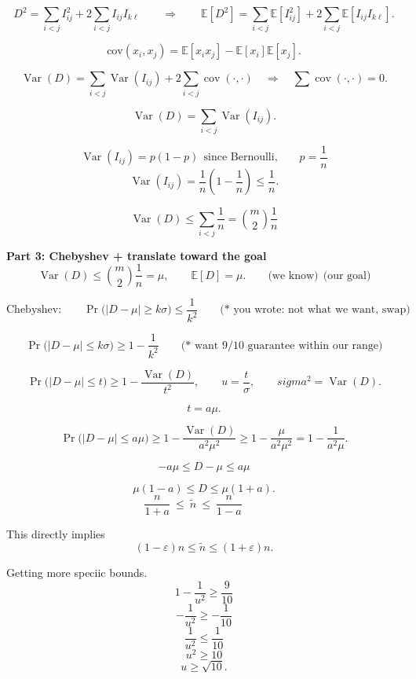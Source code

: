 \documentclass[11pt]{article}
\begin{document}
\begin{enumerate}[label=\arabic*.]
	\[
	D^2=\sum_{i<j} I_{ij}^2 + 2\sum_{i<j} I_{ij}I_{k\ell}
	\qquad\Rightarrow\qquad
	\mathbb{E}[D^2]=\sum_{i<j}\mathbb{E}[I_{ij}^2]+2\sum_{i<j}\mathbb{E}[I_{ij}I_{k\ell}].
	\]

	\[
	\text{cov}(x_i,x_j)=\mathbb{E}[x_ix_j]-\mathbb{E}[x_i]\mathbb{E}[x_j].
	\]

	\[
	\operatorname{Var}(D)
	=\sum_{i<j}\operatorname{Var}(I_{ij})+2\sum_{i<j}\operatorname{cov}(\cdot,\cdot)
	\quad\Rightarrow\quad
	\sum \operatorname{cov}(\cdot,\cdot)=0.
	\]

	\[
	\operatorname{Var}(D)=\sum_{i<j}\operatorname{Var}(I_{ij}).
	\]

	\[
	\operatorname{Var}(I_{ij})=p(1-p)\ \ \text{since Bernoulli,}\qquad
	p=\frac{1}{n}
	\]
	\[
	\operatorname{Var}(I_{ij})=\frac{1}{n}\left(1-\frac{1}{n}\right)\le \frac{1}{n}.
	\]

	\[
	\boxed{
	\operatorname{Var}(D)\le \sum_{i<j}\frac{1}{n}=\binom{m}{2}\frac{1}{n}
	}
	\]

	\textbf{Part 3: Chebyshev + translate toward the goal}
	\[
	\operatorname{Var}(D)\le \binom{m}{2}\frac{1}{n}=\mu,
	\qquad
	\mathbb{E}[D]=\mu.
	\qquad
	\text{(we know)} \ \ \text{(our goal)}
	\]

	\[
	\text{Chebyshev:}\qquad
	\Pr\bigl(|D-\mu|\ge k\sigma\bigr)\le \frac{1}{k^2}
	\qquad
	\text{(* you wrote: not what we want, swap)}
	\]

	\[
	\Pr\bigl(|D-\mu|\le k\sigma\bigr)\ge 1-\frac{1}{k^2}
	\qquad
	\text{(* want }9/10\text{ guarantee within our range)}
	\]

	\[
	\Pr\bigl(|D-\mu|\le t\bigr)\ge 1-\frac{\operatorname{Var}(D)}{t^2},
	\qquad
	u=\frac{t}{\sigma},
	\qquad
	sigma^2=\operatorname{Var}(D).
	\]

	\[
	t=a\mu.
	\]

	\[
	\Pr\bigl(|D-\mu|\le a\mu\bigr)\ge 1-\frac{\operatorname{Var}(D)}{a^2\mu^2}
	\ge 1-\frac{\mu}{a^2\mu^2}
	=1-\frac{1}{a^2\mu}.
	\]

	\[
	-a\mu \le D-\mu \le a\mu
	\]

	\[
	\mu(1-a)\le D \le \mu(1+a).
	\]
    	\[
	\boxed{
	\frac{n}{1+a}\ \le\ \tilde n\ \le\ \frac{n}{1-a}
	}
	\qquad
	\]


	This directly implies
	\[
	(1-\varepsilon)n \le \tilde n \le (1+\varepsilon)n.
	\]

    Getting more speciic bounds.
	\[
	1-\frac{1}{u^2}\ge \frac{9}{10}
	\]
	\[
	-\frac{1}{u^2}\ge -\frac{1}{10}
	\]
	\[
	\frac{1}{u^2}\le \frac{1}{10}
	\]
	\[
	u^2\ge 10
	\]
	\[
	u\ge \sqrt{10}.
	\]


\end{enumerate}
\end{document}

